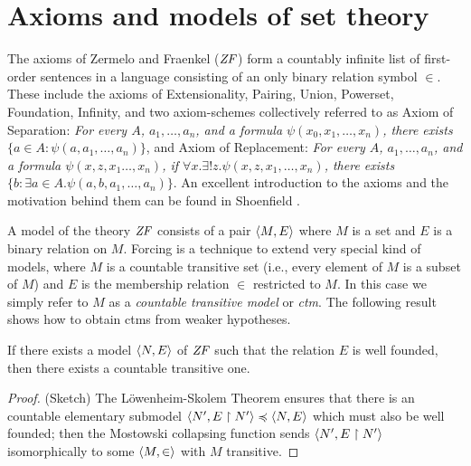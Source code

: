 \section{Axioms and models of set theory}
\label{sec:axioms-models-set-theory}

The axioms of Zermelo and Fraenkel ($\mathit{ZF}$) form a
countably infinite list of first-order sentences in a language
consisting of an only binary relation symbol $\in$. These include the
axioms of Extensionality, Pairing, Union, Powerset, Foundation, Infinity, and two
axiom-schemes collectively referred to as Axiom of Separation:
\emph{For every $A$, $a_1,\dots,a_n$,  and  a formula
  $\psi(x_0,x_1,\dots,x_n)$, there exists $\{a\in  A:
  \psi(a,a_1,\dots,a_n)\}$}, 
and Axiom of Replacement: \emph{For every $A$, $a_1,\dots,a_n$,  and
  a formula   $\psi(x,z,x_1\dots,x_n)$, if 
  $\forall x.\exists!z.\psi(x,z,x_1,\dots,x_n)$,  there exists 
  $\{b : \exists a\in A. \psi(a,b,a_1,\dots,a_n)\}$}.
An excellent introduction to the axioms and the motivation behind them
can be found in Shoenfield \cite{MR3727410}. 

A model of the theory $\mathit{ZF}$ consists of a pair $\langle M,E\rangle$ where $M$
is a set and $E$ is a binary relation on $M$. Forcing is a technique
to extend very special kind of models, where $M$ is a countable
transitive set (i.e., every element of $M$ is a subset of $M$) and
$E$ is the membership relation $\in$ restricted to $M$. In this case
we simply refer to $M$ as a \emph{countable transitive model} or
\emph{ctm}. The following result shows how to obtain ctms from weaker
hypotheses. 
%
\begin{lemma}\label{lem:wf-model-implies-ctm}
  If there exists  a
  model  $\langle N,E\rangle$  of $\mathit{ZF}$ such that the relation $E$ is well
  founded, then there exists a countable transitive one.
\end{lemma}
\begin{proof}
  (Sketch) The L\"owenheim-Skolem 
  Theorem ensures that there is an countable elementary submodel 
  $\langle N',E\upharpoonright N'\rangle\preccurlyeq  \langle N,E\rangle$ which must also be
  well founded; then the 
  Mostowski collapsing function \cite[Def.~I.9.31]{kunen2011set} sends $\langle
  N',E\upharpoonright N'\rangle$ 
  isomorphically to some $\langle M,\in\rangle$ with  $M$ transitive.
\end{proof}

